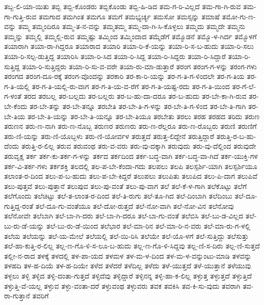 {ತಬ್ಬ-ಲಿ-ಯಾ-ಯಿತು
ತಬ್ಬಿ
ತಬ್ಬಿ-ಕೊಂಡರು
ತಬ್ಬಿಕೊಂಡು
ತಬ್ಬಿ-ಹಿ-ಡಿದ
ತಮ-ಗ-ರಿ-ವಿಲ್ಲದೆ
ತಮ-ಗಾ-ಗಿ-ರುವ
ತಮ-ಗಾ-ಗುತ್ತಿ-ರುವ
ತಮಗಾದ
ತಮಗಿಂತ
ತಮಗೂ
ತಮಗೆ
ತಮಭ್ಯರ್ಚ್ಯ
ತಮಸೋ
ತಮಸ್ಸನ್ನು
ತಮಾಷೆ
ತಮೋ-ಗು-ಣ-ವನ್ನು
ತಮ್ಮ
ತಮ್ಮಂದಿರೂ
ತಮ್ಮ-ತ-ನ-ವನ್ನು
ತಮ್ಮತಮ್ಮ
ತಮ್ಮ-ದಾ-ಗಿ-ಸಿ-ಕೊಳ್ಳಲು
ತಮ್ಮದು
ತಮ್ಮದೇ
ತಮ್ಮನು
ತಮ್ಮನ್ನು
ತಮ್ಮಲ್ಲಿ
ತಮ್ಮಲ್ಲಿ-ರುವ
ತಮ್ಮಷ್ಟು
ತಮ್ಮಿಂದ
ತಮ್ಮಿಂದಾದ
ತಮ್ಮೆಡೆಗೆ
ತಮ್ಮೊಡನೆ
ತಮ್ಮೊ-ಳ-ಗಿರ್ದ
ತಮ್ಮೊಳಗೆ
ತಯಾರಾಗಿ
ತಯಾ-ರಾ-ಗಿದ್ದರೂ
ತಯಾರಾದ
ತಯಾರಿ
ತಯಾ-ರಿ-ಕೆ-ಯನ್ನು
ತಯಾ-ರಿ-ಸ-ಬ-ಹುದು
ತಯಾ-ರಿ-ಸಲು
ತಯಾ-ರಿ-ಸಲ್ಪ-ಡುತ್ತಿದ್ದ
ತಯಾರಿಸಿ
ತಯಾ-ರಿ-ಸಿದ
ತಯಾ-ರಿ-ಸಿದ್ದ
ತಯಾ-ರಿ-ಸಿದ್ದರು
ತಯಾ-ರಿ-ಸಿದ್ದಾರೆ
ತಯಾ-ರಿ-ಸುತ್ತಿದ್ದ
ತಯಾ-ರಿ-ಸುತ್ತಿದ್ದರು
ತಯಾ-ರಿ-ಸು-ವ-ವರೇ
ತಯಾ-ರು-ಮಾ-ಡುತ್ತಾರೆ
ತರಂಗ
ತರಂಗ-ಗ-ಳನ್ನು
ತರಂಗ-ಗಳು
ತರಂಗದ
ತರಂಗ-ದೂ-ರಕ್ಕೆ
ತರಂಗ-ವೊಂದನ್ನು
ತರಕಾರಿ
ತರ-ಕಾ-ರಿ-ಯನ್ನು
ತರ-ಗ-ತಿ-ಗ-ಳಿಂದಲೇ
ತರ-ಗ-ತಿಯ
ತರ-ಗ-ತಿ-ಯಲ್ಲಿ
ತರ-ಗ-ತಿ-ಯಲ್ಲಿ-ರು-ವಾಗ
ತರ-ಗ-ತಿ-ಯ-ವ-ರೆಗೆ
ತರ-ಗ-ತಿ-ಯಷ್ಟ-ರದು
ತರ-ಗ-ತಿ-ಯಿಂದ
ತರ-ಗೆ-ಲೆ-ಗ-ಳಂತೆ
ತರದ
ತರಬಲ್ಲ
ತರ-ಬಲ್ಲದು
ತರ-ಬಲ್ಲರು
ತರ-ಬ-ಹು-ದಾ-ದರೂ
ತರ-ಬ-ಹುದು
ತರ-ಬೇ-ಕಾ-ಗಿ-ರುವ
ತರ-ಬೇ-ಕೆಂದು
ತರ-ಬೇ-ತನ್ನು
ತರ-ಬೇ-ತನ್ನೂ
ತರಬೇತಿ
ತರ-ಬೇ-ತಿ-ಗ-ಳನ್ನು
ತರ-ಬೇ-ತಿ-ಗ-ಳಿಂದ
ತರ-ಬೇ-ತಿ-ಗಾಗಿ
ತರ-ಬೇ-ತಿಯ
ತರ-ಬೇ-ತಿ-ಯನ್ನು
ತರ-ಬೇ-ತಿ-ಯನ್ನೂ
ತರ-ಬೇ-ತಿಯೂ
ತರಬೇತು
ತರಲು
ತರಹ
ತರಹದ
ತರಿದು
ತರುಣ
ತರುಣನ
ತರು-ಣ-ನಾಗಿ
ತರು-ಣ-ನೊಬ್ಬ
ತರುಣರ
ತರುಣರು
ತರು-ಣ-ರೆಲ್ಲರೂ
ತರು-ಣ-ರೊಬ್ಬರು
ತರುಣಿ
ತರುಣಿಗೆ
ತರು-ಣಿ-ಯನ್ನು
ತರು-ಣಿ-ಯೊಬ್ಬಳು
ತರು-ಣಿ-ಯೋರ್ವಳ
ತರುತ್ತದೆ
ತರುತ್ತ-ಲಿದ್ದೇನೆ
ತರುತ್ತಿದ್ದಾರೆ
ತರುತ್ತಿ-ರ-ಬ-ಹು-ದೆಂದು
ತರುತ್ತಿ-ರ-ಲಿಲ್ಲ
ತರುವ
ತರುವಂಥ
ತರು-ವ-ವರು
ತರು-ವು-ದಕ್ಕಾಗಿ
ತರುವುದು
ತರು-ವು-ದೆಲ್ಲಿಂದ
ತರುವುದೇ
ತರುವೃಕ್ಷ
ತರ್ಕ
ತರ್ಕ-ಕು-ತರ್ಕ-ಗ-ಳನ್ನು
ತರ್ಕದ
ತರ್ಕದಿಂದ
ತರ್ಕ-ಬದ್ಧ-ವಾಗಿ
ತರ್ಕ-ಬದ್ಧ-ವಾ-ಗಿದೆ
ತರ್ಕ-ಯುಕ್ತಿ-ಗಳ
ತರ್ಕ-ವಿ-ತರ್ಕ-ಗಳು
ತರ್ಕಶಕ್ತಿ
ತಲದಲ್ಲಿ
ತಲ-ಪ-ಬೇ-ಕೆಂದಾ-ಗದು
ತಲಪಲು
ತಲಪಿ
ತಲಸ್ಪರ್ಶಿ-ಯಾಗಿ
ತಲಸ್ಪರ್ಶಿಯೂ
ತಲಾಂತ-ರ-ದಿಂದ
ತಲು-ಪ-ಬ-ಹುದು
ತಲು-ಪ-ಬೇ-ಕಿದ್ದರೆ
ತಲುಪಲು
ತಲುಪಿತು
ತಲುಪಿದ
ತಲು-ಪಿ-ದಾಗ
ತಲುಪಿವೆ
ತಲು-ಪುತ್ತವೆ
ತಲು-ಪುತ್ತಾನೆ
ತಲುಪುವ
ತಲು-ಪು-ವಂತೆ
ತಲು-ಪು-ವಾಗ
ತಲೆ
ತಲೆ-ಕೆ-ಳ-ಗಾಗಿ
ತಲೆಕೊಟ್ಟು
ತಲೆಗೆ
ತಲೆಗೊಂದು
ತಲೆಚಿಟ್ಟು
ತಲೆ-ತ-ಲಾಂತ-ರ-ದಿಂದ
ತಲೆ-ತಿ-ರುಗು
ತಲೆ-ತೂ-ಗಿದ
ತಲೆ-ದಿಂಬಾಗಿ
ತಲೆದಿಂಬು
ತಲೆ-ದೂ-ಗುತ್ತಿದ್ದ-ರಂತೆ
ತಲೆ-ದೂ-ಗು-ವಂತೆಯೂ
ತಲೆ-ದೋ-ರುತ್ತದೆ
ತಲೆ-ನೋ-ವಾಗಿ
ತಲೆ-ನೋ-ವಿನ
ತಲೆನೋವು
ತಲೆನೋವೇ
ತಲೆಬಾಗಿ
ತಲೆ-ಬಾ-ಗಿ-ದರು
ತಲೆ-ಬಾ-ಗಿ-ದರೂ
ತಲೆ-ಬಾ-ಗು-ವಂತೆ
ತಲೆಬಿಸಿ
ತಲೆ-ಬು-ಡ-ವಿಲ್ಲದ
ತಲೆ-ಬು-ರು-ಡೆ-ಯನ್ನು
ತಲೆ-ಬು-ರು-ಡೆ-ಯಿಂದ
ತಲೆಭಾರ
ತಲೆ-ಮಾ-ರಿನ
ತಲೆ-ಮಾ-ರಿ-ನ-ವರು
ತಲೆ-ಮಾ-ರು-ಗ-ಳಲ್ಲಿ
ತಲೆಯ
ತಲೆಯನ್ನು
ತಲೆ-ಯ-ಮೇಲೆ
ತಲೆಯಲ್ಲಿ
ತಲೆ-ಯಿ-ರಿಸಿ
ತಲೆಯೇ
ತಲೆ-ಯೊ-ಳಗೆ
ತಲೆ-ಸುತ್ತಿದ್ದು
ತಲೆಸುತ್ತು
ತಲೆ-ಹಾ-ಕುತ್ತಿ-ರ-ಲಿಲ್ಲ
ತಲ್ಲ-ಣ-ಗೊ-ಳಿ-ಸ-ಲೂ-ಬ-ಹುದು
ತಲ್ಲ-ಣ-ಗೊ-ಳಿ-ಸಿದ್ದವು
ತಲ್ಲ-ಣಿ-ಸ-ದಿರು
ತಲ್ಲ-ಣಿ-ಸುತ್ತದೆ
ತಲ್ಲೀ-ನ-ರಾದ
ತಳಕ್ಕೆ
ತಳದಲ್ಲಿ
ತಳ-ಪಾ-ಯದ
ತಳಮಳ
ತಳ-ಮ-ಳ-ದಿಂದ
ತಳ-ಮ-ಳ-ವನ್ನುಂಟು-ಮಾಡಿ
ತಳವನ್ನು
ತಳಹದಿ
ತಳ-ಹ-ದಿಯೆ
ತಳ-ಹ-ದಿಯೇ
ತಳೆದ
ತಳೆದರೆ
ತಳೆದಿಲ್ಲ
ತಳೆದು
ತಳೆ-ಯುತ್ತದೆ
ತಳೆ-ಯುತ್ತಾನೆ
ತಳೆಯುವು
ತಳ್ಳಲು
ತಳ್ಳಿ
ತಳ್ಳಿದ
ತಳ್ಳಿ-ದಂತಾ-ಗುತ್ತದೆ
ತಳ್ಳಿದೆವು
ತಳ್ಳಿದ್ದಾರೆ
ತಳ್ಳಿನನ್ನ
ತಳ್ಳಿ-ಹಾ-ಕ-ಲಿಲ್ಲ
ತಳ್ಳುತ್ತ
ತಳ್ಳುತ್ತದೆ
ತಳ್ಳುತ್ತಿದೆ
ತಳ್ಳುತ್ತಿ-ವೆ-ಯಲ್ಲ
ತಳ್ಳುವ
ತಳ್ಳು-ವಂತಾ-ದರೆ
ತಳ್ಳುವಂಥ
ತಳ್ಳುವರು
ತವಕ
ತವಕಿಸಿ
ತವ-ಕಿ-ಸು-ವುದು
ತವರಾಗಿ
ತವ-ರಾ-ಗುತ್ತಾನೆ
ತವರಿಗೆ
}

